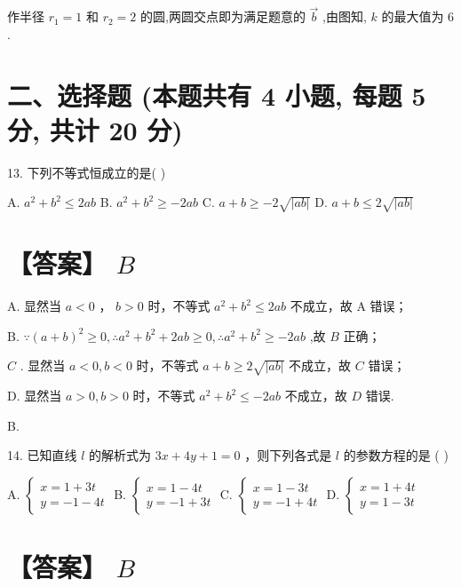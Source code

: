 \documentclass[10pt]{article}
\begin{document}
作半径 \({r}_{1} = 1\) 和 \({r}_{2} = 2\) 的圆,两圆交点即为满足题意的 \(\overrightarrow{b}\) ,由图知, \(k\) 的最大值为 6 .

\section*{二、选择题 (本题共有 4 小题, 每题 5 分, 共计 20 分)}

13. 下列不等式恒成立的是( )

A. \({a}^{2} + {b}^{2} \leq  {2ab}\) B. \({a}^{2} + {b}^{2} \geq   - {2ab}\) C. \(a + b \geq   - 2\sqrt{\left| ab\right| }\) D. \(a + b \leq  2\sqrt{\left| ab\right| }\)

\section*{【答案】 \(B\)}

A. 显然当 \(a < 0\) ， \(b > 0\) 时，不等式 \({a}^{2} + {b}^{2} \leq  {2ab}\) 不成立，故 A 错误；

B. \(\because {\left( a + b\right) }^{2} \geq  0,\therefore {a}^{2} + {b}^{2} + {2ab} \geq  0,\therefore {a}^{2} + {b}^{2} \geq   - {2ab}\) ,故 \(B\) 正确；

\(C\) . 显然当 \(a < 0,b < 0\) 时，不等式 \(a + b \geq  2\sqrt{\left| ab\right| }\) 不成立，故 \(C\) 错误；

D. 显然当 \(a > 0,b > 0\) 时，不等式 \({a}^{2} + {b}^{2} \leq   - {2ab}\) 不成立，故 \(D\) 错误.

B.

14. 已知直线 \(l\) 的解析式为 \({3x} + {4y} + 1 = 0\) ，则下列各式是 \(l\) 的参数方程的是 ( )

A. \(\left\{  \begin{array}{l} x = 1 + {3t} \\  y =  - 1 - {4t} \end{array}\right.\) B. \(\left\{  \begin{array}{l} x = 1 - {4t} \\  y =  - 1 + {3t} \end{array}\right.\) C. \(\left\{  \begin{array}{l} x = 1 - {3t} \\  y =  - 1 + {4t} \end{array}\right.\) D. \(\left\{  \begin{array}{l} x = 1 + {4t} \\  y = 1 - {3t} \end{array}\right.\)

\section*{【答案】 \(B\)}
\end{document}
